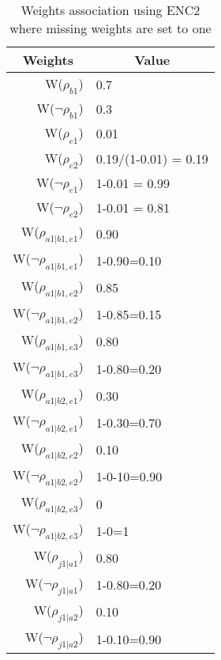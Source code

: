 \begin{table}[htb]
\centering
\caption{Weights association using ENC2 where missing weights are set to one}
\label{weightsEnc2}
\begin{tabular}{rl}
\hline
\multicolumn{1}{c}{Weights} & \multicolumn{1}{c}{Value} \\ \hline
W(\(\rho_{b1}\)) & 0.7 \\
W(\(\neg\rho_{b1}\)) & 0.3 \\
W(\(\rho_{e1}\)) & 0.01 \\
W(\(\rho_{e2}\)) & 0.19/(1-0.01) = 0.19 \\
W(\(\neg\rho_{e1}\)) & 1-0.01 = 0.99 \\
W(\(\neg\rho_{e2}\)) & 1-0.01 = 0.81 \\
W(\(\rho_{a1|b1,e1}\)) & 0.90 \\
W(\(\neg\rho_{a1|b1,e1}\)) & 1-0.90=0.10 \\
W(\(\rho_{a1|b1,e2}\)) & 0.85 \\
\multicolumn{1}{l}{W(\(\neg\rho_{a1|b1,e2}\))} & 1-0.85=0.15 \\
W(\(\rho_{a1|b1,e3}\)) & 0.80 \\
W(\(\neg\rho_{a1|b1,e3}\)) & 1-0.80=0.20 \\
W(\(\rho_{a1|b2,e1}\)) & 0.30 \\
W(\(\neg\rho_{a1|b2,e1}\)) & 1-0.30=0.70 \\
W(\(\rho_{a1|b2,e2}\)) & 0.10 \\
W(\(\neg\rho_{a1|b2,e2}\)) & 1-0-10=0.90 \\
W(\(\rho_{a1|b2,e3}\)) & 0 \\
W(\(\neg\rho_{a1|b2,e3}\)) & 1-0=1 \\
W(\(\rho_{j1|a1}\)) & 0.80 \\
W(\(\neg\rho_{j1|a1}\)) & 1-0.80=0.20 \\
W(\(\rho_{j1|a2}\)) & 0.10 \\
W(\(\neg\rho_{j1|a2}\)) & 1-0.10=0.90
\end{tabular}
\end{table}